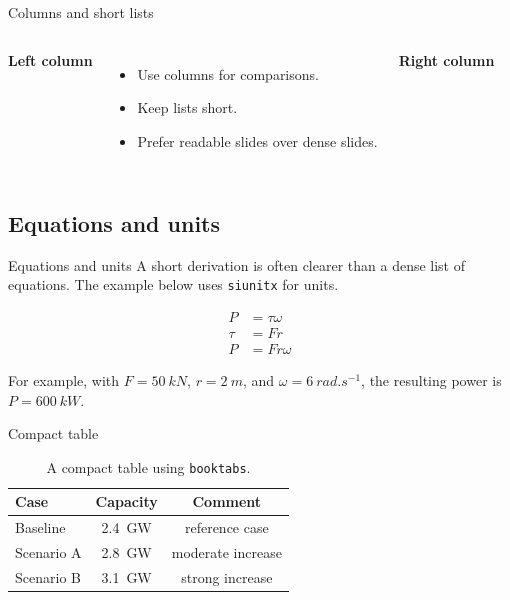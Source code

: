 \documentclass[10pt,aspectratio=169]{beamer}
\begin{document}
\begin{frame}[t]{Columns and short lists}
\begin{columns}[T,onlytextwidth]
  \textbf{Left column}
  \begin{itemize}
    \item Use columns for comparisons.
    \item Keep lists short.
    \item Prefer readable slides over dense slides.
  \end{itemize}

  \textbf{Right column}

\end{columns}
\end{frame}

\subsection{Equations and units}
\begin{frame}[t]{Equations and units}
A short derivation is often clearer than a dense list of equations. The example below uses \texttt{siunitx} for units.

%
\begin{equation}
\begin{aligned}
P &= \tau \omega \\
\tau &= F r \\
P &= F r \omega
\end{aligned}
\end{equation}
%

For example, with \(F=\qty{50}{kN}\), \(r=\qty{2}{m}\), and \(\omega=\qty{6}{rad.s^{-1}}\), the resulting power is \(P=\qty{600}{kW}\).
\end{frame}

\begin{frame}[t]{Compact table}
\begin{table}
\centering
\small
\begin{tabular}{@{}lcc@{}}
\toprule
Case & Capacity & Comment \\
\midrule
Baseline & \qty{2.4}{GW} & reference case \\
Scenario A & \qty{2.8}{GW} & moderate increase \\
Scenario B & \qty{3.1}{GW} & strong increase \\
\bottomrule
\end{tabular}
\caption{A compact table using \texttt{booktabs}.}
\end{table}
\end{frame}
\end{document}
